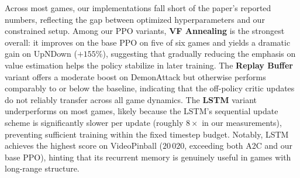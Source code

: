 \documentclass{article}
\begin{document}
\begin{table}[H]
    \centering
    \caption{\footnotesize{Mean Final Scores (Last 100 Episodes) - Bolding: Black, highest score among our implementations, red - highest score including paper}}
    \label{tab:results}
\end{table}

Across most games, our implementations fall short of the paper's reported numbers, reflecting the gap between optimized hyperparameters and our constrained setup. Among our PPO variants, \textbf{VF Annealing} is the strongest overall: it improves on the base PPO on five of six games and yields a dramatic gain on UpNDown ($+155\%$), suggesting that gradually reducing the emphasis on value estimation helps the policy stabilize in later training. The \textbf{Replay Buffer} variant offers a moderate boost on DemonAttack but otherwise performs comparably to or below the baseline, indicating that the off-policy critic updates do not reliably transfer across all game dynamics. The \textbf{LSTM} variant underperforms on most games, likely because the LSTM's sequential update scheme is significantly slower per update (roughly $8\times$ in our measurements), preventing sufficient training within the fixed timestep budget. Notably, LSTM achieves the highest score on VideoPinball ($20\,020$, exceeding both A2C and our base PPO), hinting that its recurrent memory is genuinely useful in games with long-range structure.
\end{document}
